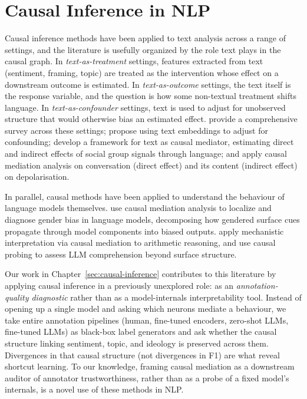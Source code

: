 \section{Causal Inference in NLP}
\label{sec:rw-causal-inference-nlp}

Causal inference methods have been applied to text analysis across a range of settings, and the literature is usefully organized by the role text plays in the causal graph. In \emph{text-as-treatment} settings, features extracted from text (sentiment, framing, topic) are treated as the intervention whose effect on a downstream outcome is estimated. In \emph{text-as-outcome} settings, the text itself is the response variable, and the question is how some non-textual treatment shifts language. In \emph{text-as-confounder} settings, text is used to adjust for unobserved structure that would otherwise bias an estimated effect. \citet{feder2022causalinferenceinnlp} provide a comprehensive survey across these settings; \citet{veitch2019textembeddingscausalinference} propose using text embeddings to adjust for confounding; \citet{keith-etal-2021-text} develop a framework for text as causal mediator, estimating direct and indirect effects of social group signals through language; and \citet{tierney-volfovsky-2021-sensitivity} apply causal mediation analysis on conversation (direct effect) and its content (indirect effect) on depolarisation.

In parallel, causal methods have been applied to understand the behaviour of language models themselves. \citet{vig2020genderbiasLLMs} use causal mediation analysis to localize and diagnose gender bias in language models, decomposing how gendered surface cues propagate through model components into biased outputs. \citet{stolfo2023mechanisticinterpretationarithmeticreasoning} apply mechanistic interpretation via causal mediation to arithmetic reasoning, and \citet{han2024surfacestructurecausalassessment} use causal probing to assess LLM comprehension beyond surface structure.

Our work in Chapter~\ref{sec:causal-inference} contributes to this literature by applying causal inference in a previously unexplored role: as an \emph{annotation-quality diagnostic} rather than as a model-internals interpretability tool. Instead of opening up a single model and asking which neurons mediate a behaviour, we take entire annotation pipelines (human, fine-tuned encoders, zero-shot LLMs, fine-tuned LLMs) as black-box label generators and ask whether the causal structure linking sentiment, topic, and ideology is preserved across them. Divergences in that causal structure (not divergences in F1) are what reveal shortcut learning. To our knowledge, framing causal mediation as a downstream auditor of annotator trustworthiness, rather than as a probe of a fixed model's internals, is a novel use of these methods in NLP.

